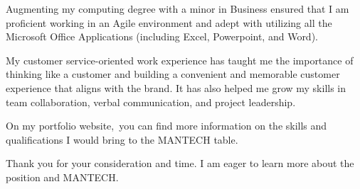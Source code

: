 \documentclass[11pt, a4paper]{awesome-cv} %
\begin{document}
\begin{cvletter}
Augmenting my computing degree with a minor in Business ensured that I am proficient working in an Agile
environment and adept with utilizing all the Microsoft Office Applications (including Excel, Powerpoint, and
Word).

My customer service-oriented work experience has taught me the importance of thinking like a customer and
building a convenient and memorable customer experience that aligns with the brand. It has also helped me
grow my skills in team collaboration, verbal communication, and project leadership.

On my portfolio website, you can find more information on the skills and
qualifications I would bring to the MANTECH table.


Thank you for your consideration and time. I am eager to learn more about the position
and MANTECH.


\end{cvletter}


\makeletterclosing %
\end{document}
